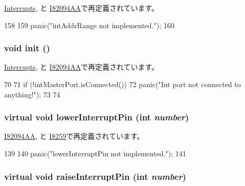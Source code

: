 \hyperlink{classX86ISA_1_1Interrupts_ad86b339471781a0d7634d3c41c6a1c87}{Interrupts}, と \hyperlink{classX86ISA_1_1I82094AA_ad86b339471781a0d7634d3c41c6a1c87}{I82094AA}で再定義されています。


\begin{DoxyCode}
158     {
159         panic("intAddrRange not implemented.\n");
160     }
\end{DoxyCode}
\hypertarget{classX86ISA_1_1IntDevice_a02fd73d861ef2e4aabb38c0c9ff82947}{
\subsubsection[{init}]{\setlength{\rightskip}{0pt plus 5cm}void init ()}}
\label{classX86ISA_1_1IntDevice_a02fd73d861ef2e4aabb38c0c9ff82947}


\hyperlink{classX86ISA_1_1Interrupts_a02fd73d861ef2e4aabb38c0c9ff82947}{Interrupts}, と \hyperlink{classX86ISA_1_1I82094AA_a02fd73d861ef2e4aabb38c0c9ff82947}{I82094AA}で再定義されています。


\begin{DoxyCode}
70 {
71     if (!intMasterPort.isConnected()) {
72         panic("Int port not connected to anything!");
73     }
74 }
\end{DoxyCode}
\hypertarget{classX86ISA_1_1IntDevice_a1909001c0927e6a93d8bebf9d30bc11c}{
\subsubsection[{lowerInterruptPin}]{\setlength{\rightskip}{0pt plus 5cm}virtual void lowerInterruptPin (int {\em number})}}
\label{classX86ISA_1_1IntDevice_a1909001c0927e6a93d8bebf9d30bc11c}


\hyperlink{classX86ISA_1_1I82094AA_a41406df644356ee1578b77b1acd18042}{I82094AA}, と \hyperlink{classX86ISA_1_1I8259_a41406df644356ee1578b77b1acd18042}{I8259}で再定義されています。


\begin{DoxyCode}
139     {
140         panic("lowerInterruptPin not implemented.\n");
141     }
\end{DoxyCode}
\hypertarget{classX86ISA_1_1IntDevice_a4bafbbd02159d7bdc6eae7f4197db84f}{
\subsubsection[{raiseInterruptPin}]{\setlength{\rightskip}{0pt plus 5cm}virtual void raiseInterruptPin (int {\em number})}}
\label{classX86ISA_1_1IntDevice_a4bafbbd02159d7bdc6eae7f4197db84f}


